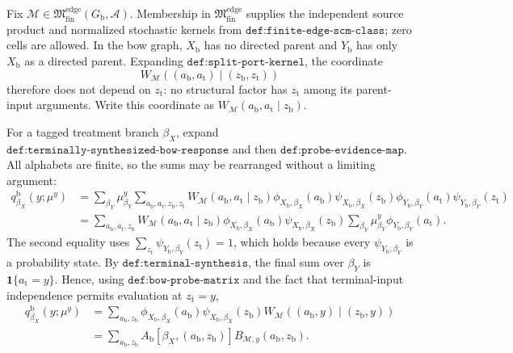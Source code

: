Fix \(\mathcal M\in\mathfrak M_{\mathrm{fin}}^{\mathrm{edge}}(G_{\mathrm b},\mathcal A)\).  Membership in \(\mathfrak M_{\mathrm{fin}}^{\mathrm{edge}}\) supplies the independent source product and normalized stochastic kernels from \(\texttt{def:finite-edge-scm-class}\); zero cells are allowed.  In the bow graph, \(X_{\mathrm b}\) has no directed parent and \(Y_{\mathrm b}\) has only \(X_{\mathrm b}\) as a directed parent.  Expanding \(\texttt{def:split-port-kernel}\), the coordinate
\[
W_{\mathcal M}((a_{\mathrm b},a_{\mathrm t})\mid(z_{\mathrm b},z_{\mathrm t}))
\]
therefore does not depend on \(z_{\mathrm t}\): no structural factor has \(z_{\mathrm t}\) among its parent-input arguments.  Write this coordinate as \(W_{\mathcal M}(a_{\mathrm b},a_{\mathrm t}\mid z_{\mathrm b})\).

For a tagged treatment branch \(\beta_X\), expand \(\texttt{def:terminally-synthesized-bow-response}\) and then \(\texttt{def:probe-evidence-map}\).  All alphabets are finite, so the sums may be rearranged without a limiting argument:
\[
\begin{aligned}
q^{\mathrm b}_{\beta_X}(y;\mu^y)
&=\sum_{\beta_Y}\mu^y_{\beta_Y}
  \sum_{a_{\mathrm b},a_{\mathrm t},z_{\mathrm b},z_{\mathrm t}}
  W_{\mathcal M}(a_{\mathrm b},a_{\mathrm t}\mid z_{\mathrm b})
  \phi_{X_{\mathrm b},\beta_X}(a_{\mathrm b})
  \psi_{X_{\mathrm b},\beta_X}(z_{\mathrm b})
  \phi_{Y_{\mathrm b},\beta_Y}(a_{\mathrm t})
  \psi_{Y_{\mathrm b},\beta_Y}(z_{\mathrm t})\\
&=\sum_{a_{\mathrm b},a_{\mathrm t},z_{\mathrm b}}
  W_{\mathcal M}(a_{\mathrm b},a_{\mathrm t}\mid z_{\mathrm b})
  \phi_{X_{\mathrm b},\beta_X}(a_{\mathrm b})
  \psi_{X_{\mathrm b},\beta_X}(z_{\mathrm b})
  \sum_{\beta_Y}\mu^y_{\beta_Y}
  \phi_{Y_{\mathrm b},\beta_Y}(a_{\mathrm t}).
\end{aligned}
\]
The second equality uses \(\sum_{z_{\mathrm t}}\psi_{Y_{\mathrm b},\beta_Y}(z_{\mathrm t})=1\), which holds because every \(\psi_{Y_{\mathrm b},\beta_Y}\) is a probability state.  By \(\texttt{def:terminal-synthesis}\), the final sum over \(\beta_Y\) is \(\mathbf 1\{a_{\mathrm t}=y\}\).  Hence, using \(\texttt{def:bow-probe-matrix}\) and the fact that terminal-input independence permits evaluation at \(z_{\mathrm t}=y\),
\[
\begin{aligned}
q^{\mathrm b}_{\beta_X}(y;\mu^y)
&=\sum_{a_{\mathrm b},z_{\mathrm b}}
 \phi_{X_{\mathrm b},\beta_X}(a_{\mathrm b})
 \psi_{X_{\mathrm b},\beta_X}(z_{\mathrm b})
 W_{\mathcal M}((a_{\mathrm b},y)\mid(z_{\mathrm b},y))\\
&=\sum_{a_{\mathrm b},z_{\mathrm b}}
 A_{\mathrm b}[\beta_X,(a_{\mathrm b},z_{\mathrm b})]
 B_{\mathcal M,y}(a_{\mathrm b},z_{\mathrm b}).
\end{aligned}
\]

